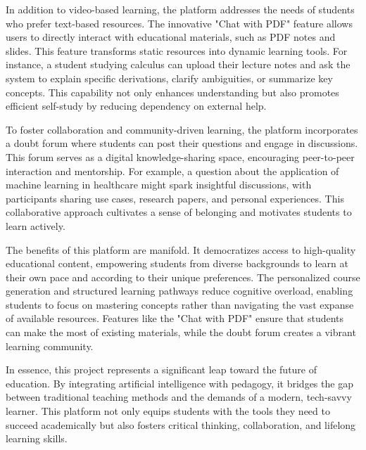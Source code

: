 In addition to video-based learning, the platform addresses the needs of students who prefer text-based resources. The innovative "Chat with PDF" feature allows users to directly interact with educational materials, such as PDF notes and slides. This feature transforms static resources into dynamic learning tools. For instance, a student studying calculus can upload their lecture notes and ask the system to explain specific derivations, clarify ambiguities, or summarize key concepts. This capability not only enhances understanding but also promotes efficient self-study by reducing dependency on external help.

To foster collaboration and community-driven learning, the platform incorporates a doubt forum where students can post their questions and engage in discussions. This forum serves as a digital knowledge-sharing space, encouraging peer-to-peer interaction and mentorship. For example, a question about the application of machine learning in healthcare might spark insightful discussions, with participants sharing use cases, research papers, and personal experiences. This collaborative approach cultivates a sense of belonging and motivates students to learn actively.

The benefits of this platform are manifold. It democratizes access to high-quality educational content, empowering students from diverse backgrounds to learn at their own pace and according to their unique preferences. The personalized course generation and structured learning pathways reduce cognitive overload, enabling students to focus on mastering concepts rather than navigating the vast expanse of available resources. Features like the "Chat with PDF" ensure that students can make the most of existing materials, while the doubt forum creates a vibrant learning community.

In essence, this project represents a significant leap toward the future of education. By integrating artificial intelligence with pedagogy, it bridges the gap between traditional teaching methods and the demands of a modern, tech-savvy learner. This platform not only equips students with the tools they need to succeed academically but also fosters critical thinking, collaboration, and lifelong learning skills. 




